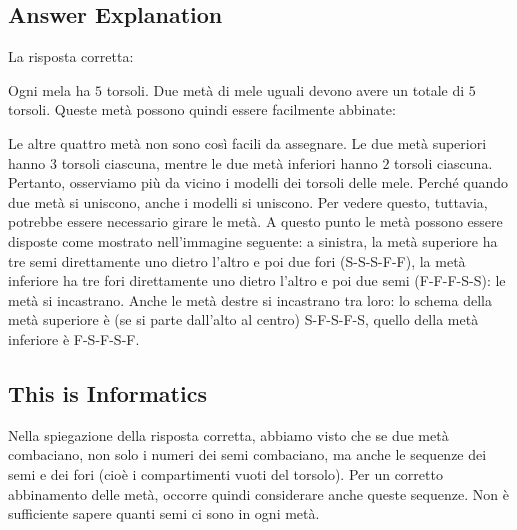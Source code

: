 \documentclass[a4paper,11pt]{report}
\newcommand{\taskGraphicsFolder}{..}
\begin{document}
\endgroup

\subsection*{Answer Explanation}

La risposta corretta:

{\centering%
\par}

Ogni mela ha $5$ torsoli. Due metà di mele uguali devono avere un totale di $5$ torsoli. Queste metà possono quindi essere facilmente abbinate:

{\centering%
\par}

Le altre quattro metà non sono così facili da assegnare. Le due metà superiori hanno $3$ torsoli ciascuna, mentre le due metà inferiori hanno $2$ torsoli ciascuna. Pertanto, osserviamo più da vicino i modelli dei torsoli delle mele.  Perché quando due metà si uniscono, anche i modelli si uniscono. Per vedere questo, tuttavia, potrebbe essere necessario girare le metà.  A questo punto le metà possono essere disposte come mostrato nell’immagine seguente: a sinistra, la metà superiore ha tre semi direttamente uno dietro l’altro e poi due fori (S-S-S-F-F), la metà inferiore ha tre fori direttamente uno dietro l’altro e poi due semi (F-F-F-S-S): le metà si incastrano. Anche le metà destre si incastrano tra loro: lo schema della metà superiore è (se si parte dall’alto al centro) S-F-S-F-S, quello della metà inferiore è F-S-F-S-F.

{\centering%
\par}


\subsection*{This is Informatics}

Nella spiegazione della risposta corretta, abbiamo visto che se due metà combaciano, non solo i numeri dei semi combaciano, ma anche le sequenze dei semi e dei fori (cioè i compartimenti vuoti del torsolo). Per un corretto abbinamento delle metà, occorre quindi considerare anche queste sequenze. Non è sufficiente sapere quanti semi ci sono in ogni metà.
\end{document}
